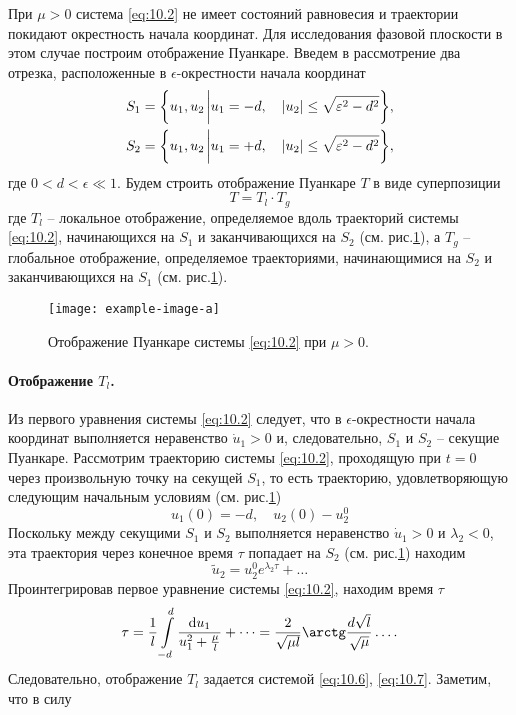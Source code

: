 При $\mu>0$ система \eqref{eq:10.2} не имеет состояний равновесия и траектории покидают окрестность начала
координат. Для исследования фазовой плоскости в этом случае построим отображение Пуанкаре. Введем
в рассмотрение два отрезка, расположенные в $\epsilon$-окрестности начала координат
\begin{align}
        S_1 &= \qty{u_1,u_2 \eval u_1 = -d, \quad \abs{u_2} \leq \sqrt{\epsilon^2-d^2} },\\
        S_2 &= \qty{u_1,u_2 \eval u_1= +d, \quad \abs{u_2} \leq \sqrt{\epsilon^2-d^2} },
\end{align}
где $0<d<\epsilon\ll 1.$ Будем строить отображение Пуанкаре $T$ в виде суперпозиции
\begin{equation}
        \label{eq:10.3}
        T = T_l \cdot  T_g 
\end{equation}
где $T_l$ -- локальное отображение, определяемое вдоль траекторий системы \eqref{eq:10.2}, начинающихся
на $S_1$  и заканчивающихся на $S_2$ (см. рис.\ref{fig:10.2}), а $T_g$ -- глобальное отображение, определяемое 
траекториями, начинающимися на $S_2$ и заканчивающихся на $S_1$ (см. рис.\ref{fig:10.2}).
\begin{figure}[h]
        \centering
        \texttt{[image: example-image-a]}
        \caption{Отображение Пуанкаре системы \eqref{eq:10.2} при $\mu>0$.}
        \label{fig:10.2}
\end{figure}

\paragraph{Отображение $T_l$.}%
Из первого уравнения системы \eqref{eq:10.2} следует, что в $\epsilon$-окрестности начала координат выполняется 
неравенство $\dot u_1 > 0$ и, следовательно, $S_1$ и $S_2$ -- секущие Пуанкаре. Рассмотрим 
траекторию системы \eqref{eq:10.2}, проходящую при $t=0$ через произвольную точку на секущей 
$S_1$, то есть траекторию, удовлетворяющую следующим начальным условиям (см. рис.\ref{fig:10.2})
\begin{equation}
        \label{eq:10.4}
        u_1(0) = - d, \quad u_2(0) - u_2^0
\end{equation}
Поскольку между секущими $S_1$ и $S_2$ выполняется неравенство
$\dot u_1>0$ и $\lambda_2<0$, эта траектория через конечное время $\tau$ попадает на $S_2$ 
(см. рис.\ref{fig:10.2}) находим
\begin{equation}
        \label{eq:10.6}
        \tilde u_2 = u_2^0 e^{\lambda_2 \tau} + \dots
\end{equation}
Проинтегрировав первое уравнение системы \eqref{eq:10.2}, находим время $\tau$ 
\begin{equation}
        \label{eq:10.7}
        \tau = \frac{1}{l} \int\limits_{-d}^{d} \frac{\dd{u_1}}{u_1^2 + \frac{\mu}{l}} + \dots
        = \frac{2}{\sqrt{\mu l}} \arctg \frac{d\sqrt l}{\sqrt \mu} \dots .
\end{equation}
Следовательно, отображение $T_l$ задается системой \eqref{eq:10.6}, \eqref{eq:10.7}.
Заметим, что в силу 


